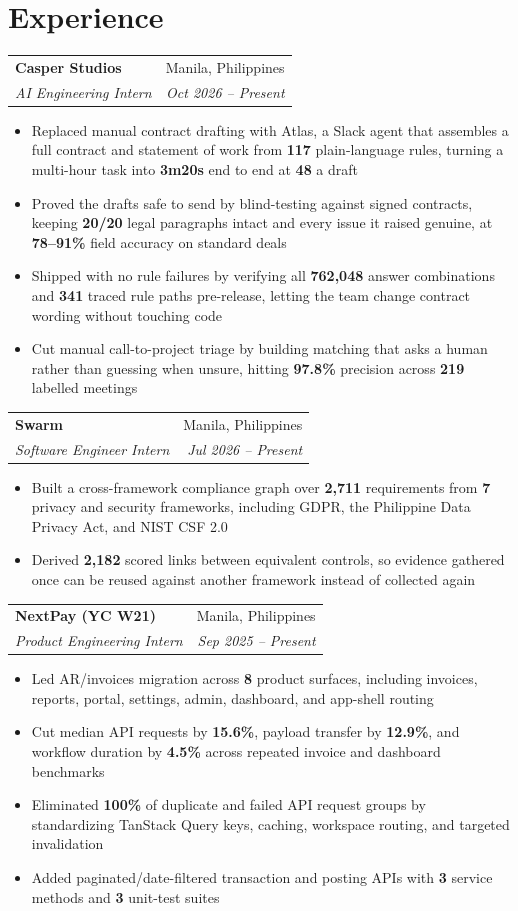 \documentclass[a4paper, 11pt]{article}
\makeatletter
\newenvironment{highlights}{
    \begin{itemize}[
        topsep=0pt,
        parsep=0pt,
        partopsep=0pt,
        itemsep=0.3pt,
        leftmargin=1.15em
    ]
}{
    \end{itemize}
}
\newcommand{\workgap}{\vspace{0.3em}}
\newcommand{\entry}[4]{%
\begin{tabularx}{\linewidth}{@{}X r@{}}
\textbf{#1} & #2 \\[1pt]
\textit{#3} & \textit{#4} \\[1.5pt]
\end{tabularx}%
}
\makeatother
\begin{document}
\section{Experience}

\entry{Casper Studios}{Manila, Philippines}{AI Engineering Intern}{Oct 2026 – Present}
\begin{highlights}
    \item Replaced manual contract drafting with Atlas, a Slack agent that assembles a full contract and statement of work from \textbf{117} plain-language rules, turning a multi-hour task into \textbf{3m20s} end to end at \textbf{48\textcent} a draft
    \item Proved the drafts safe to send by blind-testing against signed contracts, keeping \textbf{20/20} legal paragraphs intact and every issue it raised genuine, at \textbf{78--91\%} field accuracy on standard deals
    \item Shipped with no rule failures by verifying all \textbf{762,048} answer combinations and \textbf{341} traced rule paths pre-release, letting the team change contract wording without touching code
    \item Cut manual call-to-project triage by building matching that asks a human rather than guessing when unsure, hitting \textbf{97.8\%} precision across \textbf{219} labelled meetings
\end{highlights}
\workgap

\entry{Swarm}{Manila, Philippines}{Software Engineer Intern}{Jul 2026 – Present}
\begin{highlights}
    \item Built a cross-framework compliance graph over \textbf{2,711} requirements from \textbf{7} privacy and security frameworks, including GDPR, the Philippine Data Privacy Act, and NIST CSF 2.0
    \item Derived \textbf{2,182} scored links between equivalent controls, so evidence gathered once can be reused against another framework instead of collected again
\end{highlights}
\workgap

\entry{NextPay (YC W21)}{Manila, Philippines}{Product Engineering Intern}{Sep 2025 – Present}
\begin{highlights}
    \item Led AR/invoices migration across \textbf{8} product surfaces, including invoices, reports, portal, settings, admin, dashboard, and app-shell routing
    \item Cut median API requests by \textbf{15.6\%}, payload transfer by \textbf{12.9\%}, and workflow duration by \textbf{4.5\%} across repeated invoice and dashboard benchmarks
    \item Eliminated \textbf{100\%} of duplicate and failed API request groups by standardizing TanStack Query keys, caching, workspace routing, and targeted invalidation
    \item Added paginated/date-filtered transaction and posting APIs with \textbf{3} service methods and \textbf{3} unit-test suites
\end{highlights}
\workgap
\end{document}
